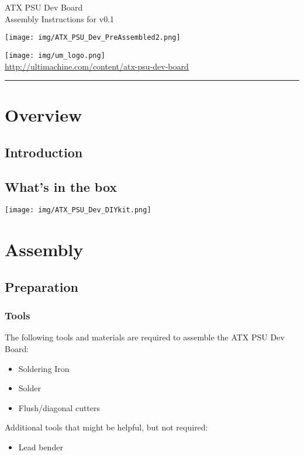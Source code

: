 \documentclass{article}
\newcommand{\HRule}[1]{\hfill \rule{0.2\linewidth}{#1}} %
\begin{document}
\begin{titlepage}

  {\Huge ATX PSU Dev Board }\\
  {\Large Assembly Instructions for v0.1} 
  \vspace*{\fill}	
  \begin{center}
  \texttt{[image: img/ATX\_PSU\_Dev\_PreAssembled2.png]}
  \end{center}
  \vspace*{\fill}

  \vfill
  {\centering \large 
  \hfill \texttt{[image: img/um\_logo.png]} \\
  \hfill \url{http://ultimachine.com/content/atx-psu-dev-board} \\

  \HRule{1pt}} %
\end{titlepage}

\clearpage %

\tableofcontents
\clearpage

\section{Overview}
\subsection{Introduction}


\subsection{What's in the box}
\begin{center}
\texttt{[image: img/ATX\_PSU\_Dev\_DIYkit.png]}
\end{center}
\section{Assembly}
\subsection{Preparation}
\subsubsection{Tools}
  The following tools and materials are required to assemble the ATX PSU Dev Board:
    \begin{itemize}
      \item{Soldering Iron}
      \item{Solder}
      \item{Flush/diagonal cutters}
    \end{itemize}
  Additional tools that might be helpful, but not required:
    \begin{itemize}
      \item{Lead bender}
    \end{itemize}
\end{document}
